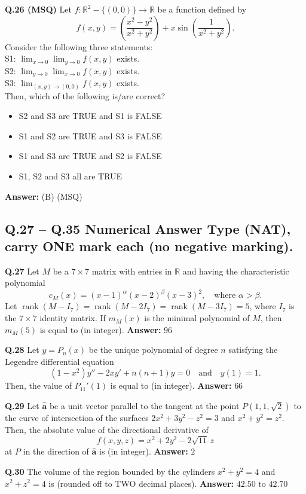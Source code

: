 \documentclass[11pt,a4paper]{article}
\newcommand{\optslistA}[4]{%
  \begin{itemize}
    \setlength{\itemsep}{2pt}\setlength{\parskip}{0pt}
    \item[(A)] #1
    \item[(B)] #2
    \item[(C)] #3
    \item[(D)] #4
  \end{itemize}%
}
\newcommand{\ans}[1]{\textbf{Answer:} #1\par\medskip}
\begin{document}
\textbf{Q.26 (MSQ)} Let $f : \mathbb{R}^2 - \{(0, 0)\} \to \mathbb{R}$ be a function defined by
\[
  f(x, y) = \left(\frac{x^2 - y^2}{x^2 + y^2}\right) + x \sin\!\left(\frac{1}{x^2 + y^2}\right).
\]
Consider the following three statements:\\
S1: $\lim_{x \to 0} \lim_{y \to 0} f(x, y)$ exists.\\
S2: $\lim_{y \to 0} \lim_{x \to 0} f(x, y)$ exists.\\
S3: $\lim_{(x, y) \to (0, 0)} f(x, y)$ exists.\\
Then, which of the following is/are correct?
\optslistA{S2 and S3 are TRUE and S1 is FALSE}{S1 and S2 are TRUE and S3 is FALSE}{S1 and S3 are TRUE and S2 is FALSE}{S1, S2 and S3 all are TRUE}
\ans{(B) (MSQ)}

\subsection*{Q.27 -- Q.35 Numerical Answer Type (NAT), carry ONE mark each (no negative marking).}

\textbf{Q.27} Let $M$ be a $7 \times 7$ matrix with entries in $\mathbb{R}$ and having the characteristic polynomial
\[
  c_M(x) = (x - 1)^\alpha (x - 2)^\beta (x - 3)^2, \quad \text{where } \alpha > \beta.
\]
Let $\operatorname{rank}(M - I_7) = \operatorname{rank}(M - 2I_7) = \operatorname{rank}(M - 3I_7) = 5$, where $I_7$ is the $7 \times 7$ identity matrix. If $m_M(x)$ is the minimal polynomial of $M$, then $m_M(5)$ is equal to \underline{\hspace{2cm}} (in integer).
\ans{$96$}

\textbf{Q.28} Let $y = P_n(x)$ be the unique polynomial of degree $n$ satisfying the Legendre differential equation
\[
  (1 - x^2)y'' - 2xy' + n(n + 1)y = 0 \quad \text{and} \quad y(1) = 1.
\]
Then, the value of $P_{11}'(1)$ is equal to \underline{\hspace{2cm}} (in integer).
\ans{$66$}

\textbf{Q.29} Let $\hat{\mathbf{a}}$ be a unit vector parallel to the tangent at the point $P(1, 1, \sqrt{2})$ to the curve of intersection of the surfaces $2x^2 + 3y^2 - z^2 = 3$ and $x^2 + y^2 = z^2$. Then, the absolute value of the directional derivative of
\[
  f(x, y, z) = x^2 + 2y^2 - 2\sqrt{11}\,z
\]
at $P$ in the direction of $\hat{\mathbf{a}}$ is \underline{\hspace{2cm}} (in integer).
\ans{$2$}

\textbf{Q.30} The volume of the region bounded by the cylinders $x^2 + y^2 = 4$ and $x^2 + z^2 = 4$ is \underline{\hspace{2cm}} (rounded off to TWO decimal places).
\ans{$42.50 \text{ to } 42.70$}
\end{document}
